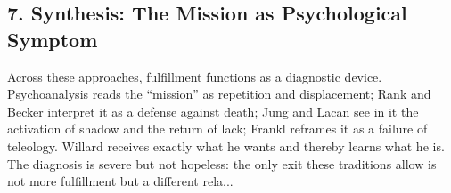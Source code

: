 \subsection*{7. Synthesis: The Mission as Psychological Symptom}
\label{ssec:7-synthesis-the-mission-as-psychological-symptom}
Across these approaches, fulfillment functions as a diagnostic device. Psychoanalysis reads the ``mission'' as repetition and displacement; Rank and Becker interpret it as a defense against death; Jung and Lacan see in it the activation of shadow and the return of lack; Frankl reframes it as a failure of teleology. Willard receives exactly what he wants and thereby learns what he is. The diagnosis is severe but not hopeless: the only exit these traditions allow is not more fulfillment but a different rela...
